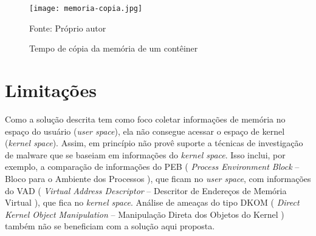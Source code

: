 
\begin{figure}[htb!]
\footnotesize
\caption{Tempo de cópia da memória de um contêiner}
\texttt{[image: memoria-copia.jpg]}
\centering
\label{fig:memoria-copia}
\begin{center}
Fonte: Próprio autor 
\end{center}
\end{figure}

\section{Limitações}
\label{sec:proposta-limit}

Como a solução descrita tem como foco coletar informações de memória no espaço do usuário (\textit{user space}), ela não consegue acessar o espaço de kernel (\textit{kernel space}). 
%
Assim, \fancyname em princípio não provê suporte a técnicas de investigação de malware que se baseiam em informações do \textit{kernel space}.
%
Isso inclui, por exemplo, a comparação de informações do PEB ( \textit{Process Environment Block} -- Bloco para o Ambiente dos Processos ), que ficam no \textit{user space}, com informações do VAD ( \textit{Virtual Address Descriptor} -- Descritor de Endereços de Memória Virtual ), que fica no \textit{kernel space}. 
%
Análise de ameaças do tipo DKOM ( \textit{Direct Kernel Object Manipulation} -- Manipulação Direta dos Objetos do Kernel ) também não se beneficiam com a solução aqui proposta. 


